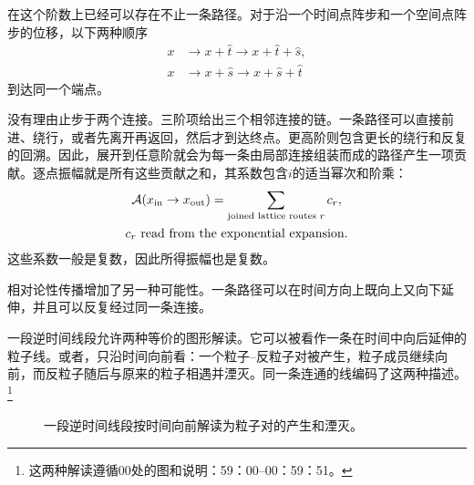 在这个阶数上已经可以存在不止一条路径。对于沿一个时间点阵步和一个空间点阵步的位移，以下两种顺序
\begin{align}
x
&\longrightarrow x+\hat t
\longrightarrow x+\hat t+\hat s,\\
x
&\longrightarrow x+\hat s
\longrightarrow x+\hat s+\hat t
\end{align}
到达同一个端点。

\begin{classroomqa}
\end{classroomqa}

没有理由止步于两个连接。三阶项给出三个相邻连接的链。一条路径可以直接前进、绕行，或者先离开再返回，然后才到达终点。更高阶则包含更长的绕行和反复的回溯。因此，展开到任意阶就会为每一条由局部连接组装而成的路径产生一项贡献。逐点振幅就是所有这些贡献之和，其系数包含\(i\)的适当幂次和阶乘：
\begin{equation}
\begin{gathered}
\mathcal{A}(x_{\mathrm{in}}\to x_{\mathrm{out}})
=
\sum_{\text{joined lattice routes }r}c_r,
\\
c_r\ \hbox{read from the exponential expansion}.
\end{gathered}
\end{equation}
这些系数一般是复数，因此所得振幅也是复数。

相对论性传播增加了另一种可能性。一条路径可以在时间方向上既向上又向下延伸，并且可以反复经过同一条连接。

\begin{classroomqa}
\end{classroomqa}

一段逆时间线段允许两种等价的图形解读。它可以被看作一条在时间中向后延伸的粒子线。或者，只沿时间向前看：一个粒子--反粒子对被产生，粒子成员继续向前，而反粒子随后与原来的粒子相遇并湮灭。同一条连通的线编码了这两种描述。\footnote{这两种解读遵循00处的图和说明：59：00--00：59：51。}

\begin{figure}[htbp]
\centering
{}
\caption{一段逆时间线段按时间向前解读为粒子对的产生和湮灭。}
\end{figure}

